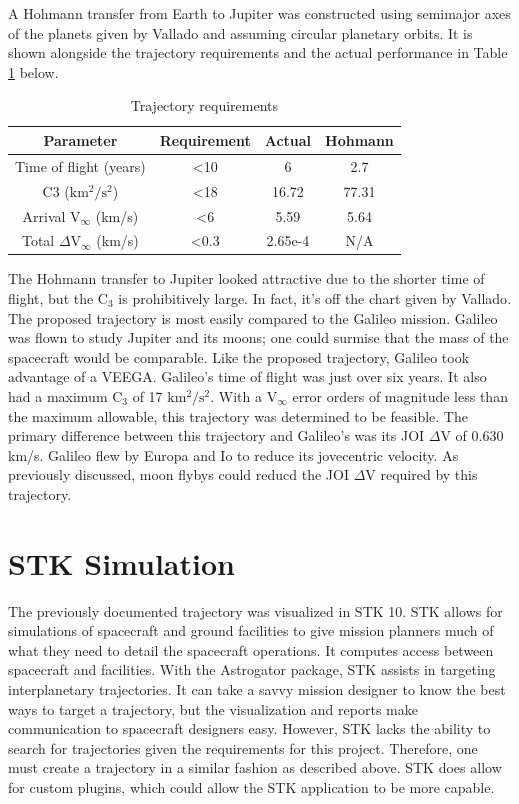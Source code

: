 \documentclass[]{aiaa-tc}%
\begin{document}
A Hohmann transfer from Earth to Jupiter was constructed using semimajor axes of the planets given by Vallado\cite{Vallado} and assuming circular planetary orbits. It is shown alongside the trajectory requirements and the actual performance in Table \ref{TrajReqs} below. 
\begin{table}[H]
\centering
\caption{Trajectory requirements}
\label{TrajReqs}
\begin{tabular}{|c|c|c|c|}
\hline
\rowcolor[HTML]{C0C0C0} 
\textbf{Parameter}     & \textbf{Requirement} & \textbf{Actual}& \textbf{Hohmann} \\ \hline
Time of flight (years) & \textless10          & 6       & 2.7        \\ \hline
C3 ($\mathrm{km^2/s^2}$)              & \textless18          & 16.72     & 77.31      \\ \hline
Arrival V$_\infty$ (km/s)       & \textless6           & 5.59       & 5.64     \\ \hline
Total $\Delta$V$_\infty$ (km/s)         & \textless0.3           & 2.65e-4    & N/A     \\ \hline
\end{tabular}
\end{table}
The Hohmann transfer to Jupiter looked attractive due to the shorter time of flight, but the C$_3$ is prohibitively large. In fact, it's off the chart given by Vallado\cite{Vallado}. The proposed trajectory is most easily compared to the Galileo mission. Galileo was flown to study Jupiter and its moons; one could surmise that the mass of the spacecraft would be comparable. Like the proposed trajectory, Galileo took advantage of a VEEGA. Galileo's time of flight was just over six years. It also had a maximum C$_3$ of 17 $\mathrm{km^2/s^2}$\cite{Damario}. With a V$_\infty$ error orders of magnitude less than the maximum allowable, this trajectory was determined to be feasible. The primary difference between this trajectory and Galileo's was its JOI $\Delta$V of 0.630 km/s.  Galileo flew by Europa and Io to reduce its jovecentric velocity. As previously  discussed, moon flybys could reducd the JOI $\Delta$V required by this trajectory.

	\section{STK Simulation}
The previously documented trajectory was visualized in STK 10. STK allows for simulations of spacecraft and ground facilities to give mission planners much of what they need to detail the spacecraft operations. It computes access between spacecraft and facilities. With the Astrogator package, STK assists in targeting interplanetary trajectories. It can take a savvy mission designer to know the best ways to target a trajectory, but the visualization and reports make communication to spacecraft designers easy. However, STK lacks the ability to search for trajectories given the requirements for this project. Therefore, one must create a trajectory in a similar fashion as described above. STK does allow for custom plugins, which could allow the STK application to be more capable. 
	
\end{document}
